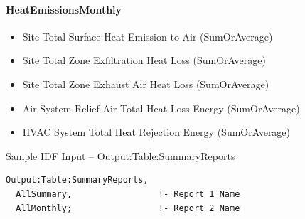 \paragraph{HeatEmissionsMonthly}\label{HeatEmissionsMonthly}

\begin{itemize}
\item
  Site Total Surface Heat Emission to Air (SumOrAverage)
\item
  Site Total Zone Exfiltration Heat Loss (SumOrAverage)
\item
  Site Total Zone Exhaust Air Heat Loss (SumOrAverage)
\item
  Air System Relief Air Total Heat Loss Energy (SumOrAverage)
\item
  HVAC System Total Heat Rejection Energy (SumOrAverage)
\end{itemize}

Sample IDF Input -- Output:Table:SummaryReports

\begin{lstlisting}
Output:Table:SummaryReports,
  AllSummary,                 !- Report 1 Name
  AllMonthly;                 !- Report 2 Name
\end{lstlisting}
